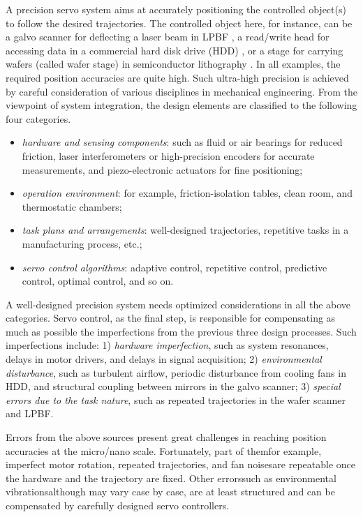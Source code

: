 \documentclass [11pt, proquest] {uwthesis}[2020/02/24]
\begin{document}
A precision servo system aims at accurately positioning the controlled
object(s) to follow the desired trajectories. The controlled object
here, for instance, can be a galvo scanner for deflecting
a laser beam in LPBF \cite{wang2016spectral}, a read/write head for accessing data in
a commercial hard disk drive (HDD) \cite{atsumi2014compensating},
or a stage for carrying wafers (called wafer stage) in semiconductor
lithography \cite{oomen2014connecting}. In all examples, the required position accuracies
are quite high. Such ultra-high precision is achieved by careful
consideration of various disciplines in mechanical engineering. From
the viewpoint of system integration, the design elements are classified
to the following four categories.
\begin{itemize}
\item \emph{hardware and sensing components}: such as fluid or air bearings
for reduced friction, laser interferometers or high-precision encoders
for accurate measurements, and piezo-electronic actuators for fine
positioning;
\item \emph{operation environment}: for example, friction-isolation tables,
clean room, and thermostatic chambers;
\item \emph{task plans and arrangements}: well-designed trajectories, repetitive
tasks in a manufacturing process, etc.;
\item \emph{servo control algorithms}: adaptive control, repetitive control,
predictive control, optimal control, and so on.
\end{itemize}
A well-designed precision system needs optimized considerations in
all the above categories. Servo control, as the final step, is responsible
for compensating as much as possible the imperfections from the previous
three design processes. Such imperfections include:\emph{ }1)\emph{
hardware imperfection}, such as system resonances, delays in motor
drivers, and delays in signal acquisition; 2)\emph{ environmental
disturbance}, such as turbulent airflow, periodic disturbance from
cooling fans in HDD, and structural coupling between mirrors in the
galvo scanner; 3)\emph{ special errors due to the task nature}, such
as repeated trajectories in the wafer scanner and LPBF.

Errors from the above sources present great challenges in reaching
position accuracies at the micro/nano scale. Fortunately, part of
them\textemdash for example, imperfect motor rotation, repeated trajectories,
and fan noises\textemdash are repeatable once the hardware and the
trajectory are fixed. Other errors\textemdash such as environmental
vibrations\textemdash although may vary case by case, are at least
structured and can be compensated by carefully designed servo controllers. 
\end{document}
